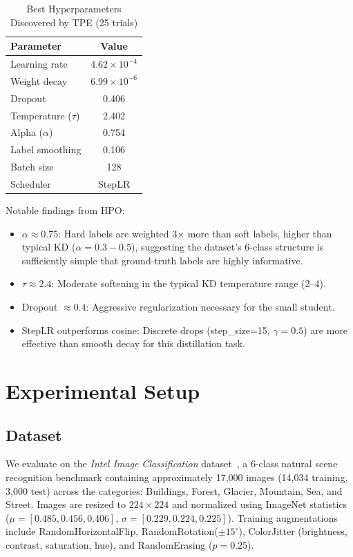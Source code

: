 \documentclass[journal]{IEEEtran}
\begin{document}
\begin{table}[!t]
\renewcommand{\arraystretch}{1.2}
\caption{Best Hyperparameters Discovered by TPE (25 trials)}
\label{tab:tpe_params}
\centering
\begin{tabular}{lc}
\toprule
\textbf{Parameter} & \textbf{Value} \\
\midrule
Learning rate       & $4.62 \times 10^{-4}$ \\
Weight decay        & $6.99 \times 10^{-6}$ \\
Dropout             & 0.406 \\
Temperature ($\tau$) & 2.402 \\
Alpha ($\alpha$)    & 0.754 \\
Label smoothing     & 0.106 \\
Batch size          & 128 \\
Scheduler           & StepLR \\
\bottomrule
\end{tabular}
\end{table}

Notable findings from HPO:
\begin{itemize}
    \item $\alpha \approx 0.75$: Hard labels are weighted 3$\times$ more than soft labels,
    higher than typical KD ($\alpha=0.3-0.5$), suggesting the dataset's 6-class structure
    is sufficiently simple that ground-truth labels are highly informative.
    \item $\tau \approx 2.4$: Moderate softening in the typical KD temperature range (2--4).
    \item Dropout $\approx 0.4$: Aggressive regularization necessary for the small student.
    \item StepLR outperforms cosine: Discrete drops (step\_size=15, $\gamma=0.5$) are more
    effective than smooth decay for this distillation task.
\end{itemize}

\section{Experimental Setup}
\label{sec:experiments}

\subsection{Dataset}

We evaluate on the \textit{Intel Image Classification} dataset~\cite{intelDataset}, a
6-class natural scene recognition benchmark containing approximately 17,000 images
(14,034 training, 3,000 test) across the categories: Buildings, Forest, Glacier,
Mountain, Sea, and Street. Images are resized to $224\times224$ and normalized using
ImageNet statistics ($\mu=[0.485, 0.456, 0.406]$, $\sigma=[0.229, 0.224, 0.225]$).
Training augmentations include RandomHorizontalFlip, RandomRotation($\pm15^\circ$),
ColorJitter (brightness, contrast, saturation, hue), and RandomErasing ($p=0.25$).
\end{document}
